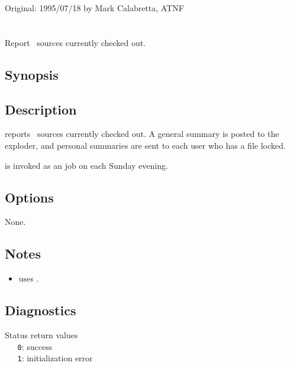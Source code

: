 Original: 1995/07/18 by Mark Calabretta, ATNF


\newpage
\section{}
\label{asco}

Report \aipspp\ sources currently checked out.

\subsection*{Synopsis}
 
\begin{synopsis}
\end{synopsis}
 
\subsection*{Description}
 
 reports \aipspp\ sources currently checked out.  A general summary
is posted to the \mbox{} exploder, and personal summaries
are sent to each user who has a file locked.

 is invoked as an   job on
 each Sunday evening.
 
\subsection*{Options}
 
None.
 
\subsection*{Notes}
 
\begin{itemize}
\item
    uses .
\end{itemize}
 
\subsection*{Diagnostics}
 
Status return values
\\ \verb+   0+: success
\\ \verb+   1+: initialization error
 
